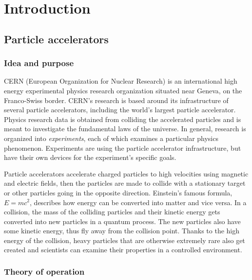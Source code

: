 \documentclass[12pt]{article}
\begin{document}
\newpage
\section{Introduction}\label{sec_intro}

\subsection{Particle accelerators}\label{sec_part_accel_intro}

\subsubsection{Idea and purpose}\label{sec_part_accel_idea}

CERN (European Organization for Nuclear Research) is an international high energy experimental physics research organization situated near Geneva, on the Franco-Swiss border. CERN's research is based around its infrastructure of several particle accelerators, including the world's largest particle accelerator. Physics research data is obtained from colliding the accelerated particles and is meant to investigate the fundamental laws of the universe. In general, research is organized into \textit{experiments}, each of which examines a particular physics phenomenon. Experiments are using the particle accelerator infrastructure, but have their own devices for the experiment's specific goals.
\cite{cern_about}

\vspace{1pc}\noindent
Particle accelerators accelerate charged particles to high velocities using magnetic and electric fields, then the particles are made to collide with a stationary target or other particles going in the opposite direction. Einstein's famous formula, $E=mc^2$, describes how energy can be converted into matter and vice versa. In a collision, the mass of the colliding particles and their kinetic energy gets converted into new particles in a quantum process. The new particles also have some kinetic energy, thus fly away from the collision point. Thanks to the high energy of the collision, heavy particles that are otherwise extremely rare also get created and scientists can examine their properties in a controlled environment.

\subsubsection{Theory of operation}\label{sec_part_accel_theory}
\end{document}
